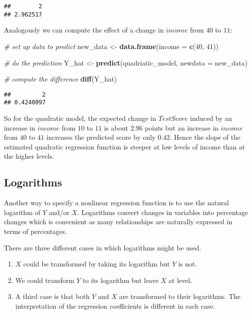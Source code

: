 \documentclass[]{book}
\newenvironment{Shaded}{\begin{snugshade}}{\end{snugshade}}
\newcommand{\KeywordTok}[1]{\textcolor[rgb]{0.13,0.29,0.53}{\textbf{#1}}}
\newcommand{\DataTypeTok}[1]{\textcolor[rgb]{0.13,0.29,0.53}{#1}}
\newcommand{\DecValTok}[1]{\textcolor[rgb]{0.00,0.00,0.81}{#1}}
\newcommand{\StringTok}[1]{\textcolor[rgb]{0.31,0.60,0.02}{#1}}
\newcommand{\CommentTok}[1]{\textcolor[rgb]{0.56,0.35,0.01}{\textit{#1}}}
\newcommand{\NormalTok}[1]{#1}
\theoremstyle{definition}
\theoremstyle{definition}
\theoremstyle{definition}
\theoremstyle{remark}
\begin{document}
\begin{verbatim}
##        2 
## 2.962517
\end{verbatim}

Analogously we can compute the effect of a change in \(income\) from
\(40\) to \(11\):

\begin{Shaded}
\begin{Highlighting}[]
\CommentTok{# set up data to predict}
\NormalTok{new_data <-}\StringTok{ }\KeywordTok{data.frame}\NormalTok{(}\DataTypeTok{income =} \KeywordTok{c}\NormalTok{(}\DecValTok{40}\NormalTok{, }\DecValTok{41}\NormalTok{))}

\CommentTok{# do the prediction}
\NormalTok{Y_hat <-}\StringTok{ }\KeywordTok{predict}\NormalTok{(quadriatic_model, }\DataTypeTok{newdata =}\NormalTok{ new_data)}

\CommentTok{# compute the difference}
\KeywordTok{diff}\NormalTok{(Y_hat)}
\end{Highlighting}
\end{Shaded}

\begin{verbatim}
##         2 
## 0.4240097
\end{verbatim}

So for the quadratic model, the expected change in \(TestScore\) induced
by an increase in \(income\) from \(10\) to \(11\) is about \(2.96\)
points but an increase in \(income\) from \(40\) to \(41\) increases the
predicted score by only \(0.42\). Hence the slope of the estimated
quadratic regression function is steeper at low levels of income than at
the higher levels.

\subsection*{Logarithms}\label{logarithms}

Another way to specify a nonlinear regression function is to use the
natural logarithm of \(Y\) and/or \(X\). Logarithms convert changes in
variables into percentage changes which is convenient as many
relationships are naturally expressed in terms of percentages.

There are three different cases in which logarithms might be used.

\begin{enumerate}
\def\labelenumi{\arabic{enumi}.}
\item
  \(X\) could be transformed by taking its logarithm but \(Y\) is not.
\item
  We could transform \(Y\) to its logarithm but leave \(X\) at level.
\item
  A third case is that both \(Y\) and \(X\) are transformed to their
  logarithms. The interpretation of the regression coefficients is
  different in each case.
\end{enumerate}
\end{document}
